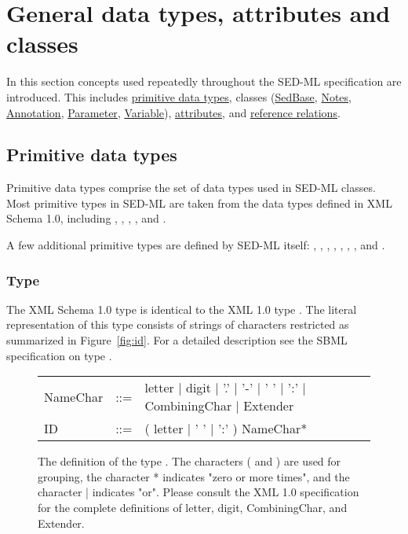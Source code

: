 \pagebreak

\section{General data types, attributes and classes}
In this section concepts used repeatedly throughout the SED-ML specification are introduced. This includes  \hyperref[sec:dataTypes]{primitive data types}, classes (\hyperref[class:sedBase]{SedBase}, \hyperref[class:notes]{Notes}, \hyperref[class:notes]{Annotation}, \hyperref[class:parameter]{Parameter}, \hyperref[class:variable]{Variable}), \hyperref[sec:generalAttributes]{attributes}, and \hyperref[sec:reference]{reference relations}.

\subsection{Primitive data types}
\label{sec:dataTypes}
Primitive data types comprise the set of data types used in SED-ML classes. Most primitive types in SED-ML are taken from the data types defined in XML Schema 1.0, including , , , ,  and . 

A few additional primitive types are defined by SED-ML itself: \hyperref[type:id]{}, \hyperref[type:sid]{}, \hyperref[type:sidref]{}, \hyperref[type:xpath]{}, \hyperref[type:mathml]{}, \hyperref[type:anyURI]{}, \hyperref[type:numlsid]{}, and \hyperref[type:numlsidref]{}.

\subsubsection[\element{ID}]{Type }
\label{type:id}
The XML Schema 1.0 type  is identical to the XML 1.0 type . The literal representation of this type consists of strings of characters restricted as summarized in Figure~\vref{fig:id}. For a detailed description see the SBML specification on type  \citep{HBH+10}.

\begin{figure}[hbt]
  \ttfamily
  \small
  \centering
  \begin{tabular}{lll}
    NameChar & ::= & letter | digit | '.' | '-' | ' ' | ':' | CombiningChar | Extender\\
    ID    & ::= & ( letter | ' ' | ':' ) NameChar*\\
  \end{tabular}
  \vspace*{-1ex}
  \caption{The definition of the type . The characters ( and ) are used for grouping, the character * indicates "zero or more times", and the character | indicates "or". Please consult the XML 1.0 specification for the complete definitions of letter, digit, CombiningChar, and Extender.}
  \label{fig:id}
\end{figure}

